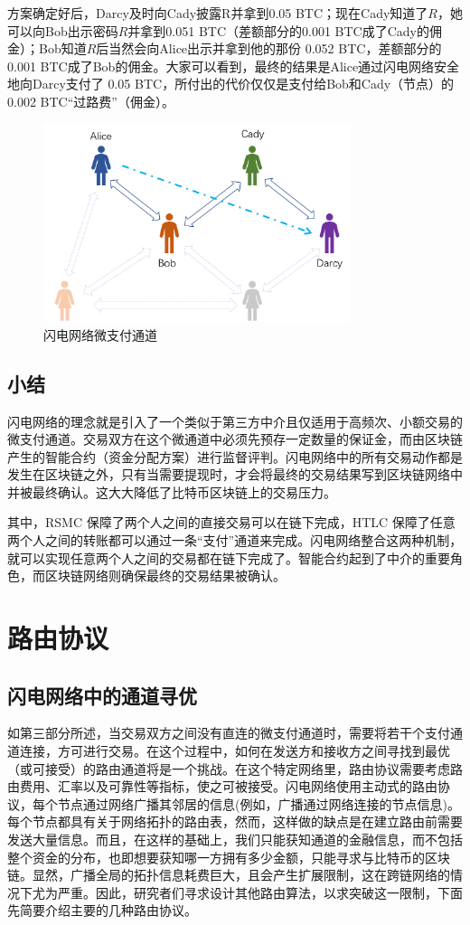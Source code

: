 \documentclass[12pt,a4paper]{article}
\begin{document}
方案确定好后，Darcy及时向Cady披露R并拿到0.05 BTC；现在Cady知道了$R$，她可以向Bob出示密码$R$并拿到0.051 BTC（差额部分的0.001 BTC成了Cady的佣金）；Bob知道$R$后当然会向Alice出示并拿到他的那份 0.052 BTC，差额部分的 0.001 BTC成了Bob的佣金。大家可以看到，最终的结果是Alice通过闪电网络安全地向Darcy支付了 0.05 BTC，所付出的代价仅仅是支付给Bob和Cady（节点）的 0.002 BTC“过路费”（佣金）。

\begin{figure}[htb]
\centering
\includegraphics[width=9cm]{channels}
\caption{闪电网络微支付通道}
\end{figure}

\subsection{小结}
闪电网络的理念就是引入了一个类似于第三方中介且仅适用于高频次、小额交易的微支付通道。交易双方在这个微通道中必须先预存一定数量的保证金，而由区块链产生的智能合约（资金分配方案）进行监督评判。闪电网络中的所有交易动作都是发生在区块链之外，只有当需要提现时，才会将最终的交易结果写到区块链网络中并被最终确认。这大大降低了比特币区块链上的交易压力。

其中，RSMC 保障了两个人之间的直接交易可以在链下完成，HTLC 保障了任意两个人之间的转账都可以通过一条“支付”通道来完成。闪电网络整合这两种机制，就可以实现任意两个人之间的交易都在链下完成了。智能合约起到了中介的重要角色，而区块链网络则确保最终的交易结果被确认。

\section{路由协议}
\subsection{闪电网络中的通道寻优}
如第三部分所述，当交易双方之间没有直连的微支付通道时，需要将若干个支付通道连接，方可进行交易。在这个过程中，如何在发送方和接收方之间寻找到最优（或可接受）的路由通道将是一个挑战。在这个特定网络里，路由协议需要考虑路由费用、汇率以及可靠性等指标，使之可被接受。闪电网络使用主动式的路由协议，每个节点通过网络广播其邻居的信息(例如，广播通过网络连接的节点信息)。每个节点都具有关于网络拓扑的路由表，然而，这样做的缺点是在建立路由前需要发送大量信息。而且，在这样的基础上，我们只能获知通道的金融信息，而不包括整个资金的分布，也即想要获知哪一方拥有多少金额，只能寻求与比特币的区块链。显然，广播全局的拓扑信息耗费巨大，且会产生扩展限制，这在跨链网络的情况下尤为严重。因此，研究者们寻求设计其他路由算法，以求突破这一限制，下面先简要介绍主要的几种路由协议。
\end{document}

